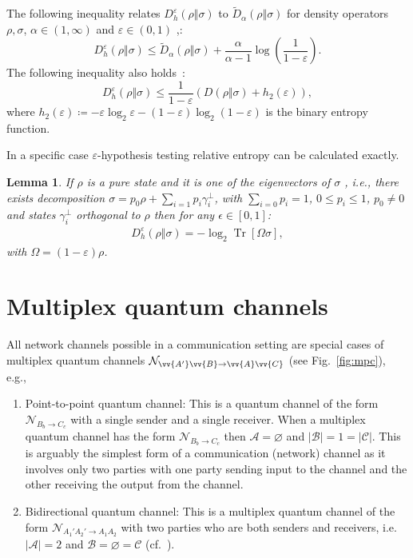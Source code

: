 \documentclass[aps,pra,twocolumn,superscriptaddress,longbibliography]{revtex4-1}
\def\Tr{\operatorname{Tr}}
\let\emptyset\varnothing
\newcommand{\mc}[1]{\mathcal{#1}}
\newcommand{\wt}[1]{\widetilde{#1}}
\newtheorem{lemma}{Lemma}
\begin{document}
\begin{appendix}
The following inequality relates $D^\varepsilon_h(\rho\Vert \sigma)$ to $\wt{D}_{\alpha}(\rho\Vert\sigma)$ for density operators $\rho,\sigma$, $\alpha\in(1,\infty)$ and $\varepsilon\in(0,1)$ \cite{HP91,N01,ON00},\cite[Lemma~5]{CMW14}:
\begin{equation}\label{eq:hyp-sand-rel}
D^\varepsilon_h(\rho\Vert \sigma)\leq  \wt{D}_{\alpha}(\rho\Vert\sigma)+\frac{\alpha}{\alpha-1}\log\left(\frac{1}{1-\varepsilon}\right).
\end{equation}
The following inequality also holds~\cite{WR12}:
\begin{equation}
D^\varepsilon_h(\rho\Vert\sigma)\leq \frac{1}{1-\varepsilon}\left(D(\rho\Vert\sigma)+h_2(\varepsilon)\right),
\end{equation}
where $h_2(\varepsilon)\coloneqq -\varepsilon\log_2\varepsilon-(1-\varepsilon)\log_2 (1-\varepsilon)$ is the binary entropy function. 

In a specific case $\varepsilon$-hypothesis testing relative entropy can be calculated exactly.
\begin{lemma}\label{lem:exactD} If $\rho$ is a pure state and it is one of the eigenvectors of $\sigma$ , i.e., there exists decomposition $\sigma = p_0 \rho + \sum_{i=1} p_i \gamma_i^\perp$, with $\sum_{i=0}p_i=1$, $0\le p_i \le 1$, $p_0 \neq 0$ and states $\gamma_i^\perp$ orthogonal to $\rho$ then for any $\epsilon \in [0,1]$:
\begin{align}
	D_h^\varepsilon \left(\rho \Vert \sigma  \right) = -\log_2 \Tr \left[\Omega \sigma\right],
\end{align}
with $\Omega = (1-\varepsilon)\rho$.
\end{lemma}

\section{Multiplex quantum channels}\label{app:mqc}
All network channels possible in a communication setting are special cases of multiplex quantum channels $\mc{N}_{\vv{A'}\vv{B}\to\vv{A}\vv{C}}$ (see Fig.~\ref{fig:mpc}), e.g.,
\begin{enumerate}
\item Point-to-point quantum channel: This is a quantum channel of the form $\mathcal{N}_{B_b\to C_c}$ with a single sender and
a single receiver. When a multiplex quantum channel has the form $\mathcal{N}_{B_b\to
C_c}$ then $\mathscr{A}=\emptyset$ and $|\mathscr{B}|=1=|\mathscr{C}|$. This is arguably
the simplest form of a communication (network) channel as it involves only two parties with
one party sending input to the channel and the other receiving the output from the channel.
\item Bidirectional quantum channel: This is a multiplex quantum channel of the form $\mc{N}_{A_1'A_2'\to A_1A_2}$ with two parties who are
both senders and receivers, i.e. $|\mathscr{A}|=2$ and $\mathscr{B}=\emptyset=\mathscr{C}$ (cf.~\cite{D18thesis,BHLS03}).


\end{enumerate}
\end{appendix}
\end{document}

